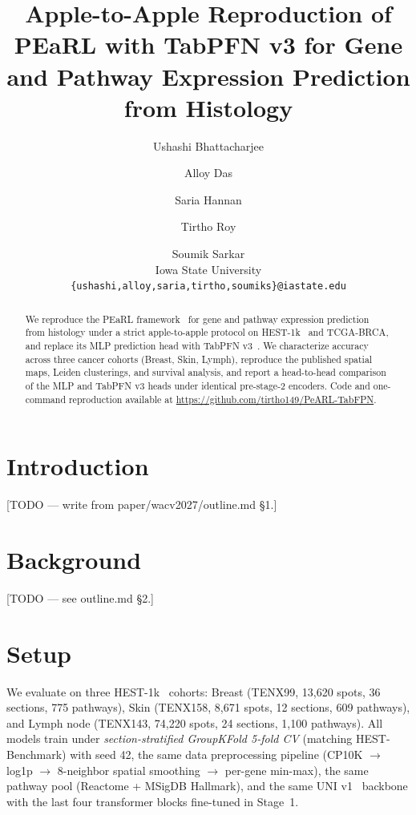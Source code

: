 \documentclass[10pt,twocolumn,letterpaper]{article}
\title{Apple-to-Apple Reproduction of PEaRL with TabPFN v3 for Gene and Pathway Expression Prediction from Histology}
\author{Ushashi Bhattacharjee \and Alloy Das \and Saria Hannan \and Tirtho Roy \and Soumik Sarkar\\
Iowa State University\\
\texttt{\{ushashi,alloy,saria,tirtho,soumiks\}@iastate.edu}}
\date{}
\begin{document}
\maketitle

\begin{abstract}
We reproduce the PEaRL framework~\cite{majumder2025pearl} for gene and pathway
expression prediction from histology under a strict apple-to-apple protocol on
HEST-1k~\cite{jaume2024hest} and TCGA-BRCA, and replace its MLP prediction
head with TabPFN v3~\cite{priorlabs2024tabpfn}. We characterize accuracy across
three cancer cohorts (Breast, Skin, Lymph), reproduce the published spatial
maps, Leiden clusterings, and survival analysis, and report a head-to-head
comparison of the MLP and TabPFN v3 heads under identical pre-stage-2
encoders. Code and one-command reproduction available at
\url{https://github.com/tirtho149/PeARL-TabFPN}.
\end{abstract}

\section{Introduction}
[TODO — write from paper/wacv2027/outline.md \S 1.]

\section{Background}
[TODO — see outline.md \S 2.]

\section{Setup}
We evaluate on three HEST-1k~\cite{jaume2024hest} cohorts:
Breast (TENX99, 13{,}620 spots, 36 sections, 775 pathways), Skin (TENX158,
8{,}671 spots, 12 sections, 609 pathways), and Lymph node (TENX143, 74{,}220
spots, 24 sections, 1{,}100 pathways). All models train under
\textit{section-stratified GroupKFold 5-fold CV} (matching HEST-Benchmark) with
seed 42, the same data preprocessing pipeline (CP10K $\rightarrow$ log1p $\rightarrow$ 8-neighbor
spatial smoothing $\rightarrow$ per-gene min-max), the same pathway pool (Reactome +
MSigDB Hallmark), and the same UNI v1~\cite{chen2024uni} backbone with the
last four transformer blocks fine-tuned in Stage~1.
\end{document}
